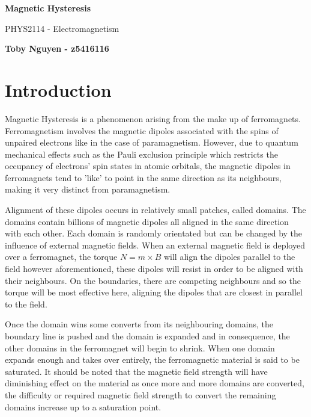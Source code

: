 \documentclass{article}
\begin{document}
\begin{titlepage}
    \begin{center}
        \vspace*{7cm}

        \Huge
        \textbf{Magnetic Hysteresis}

        \vspace{0.5cm}
        \LARGE
        PHYS2114 - Electromagnetism

        \vspace{1.5cm}

        \textbf{Toby Nguyen - z5416116}
    \end{center}
\end{titlepage}

\tableofcontents

\newpage

\section{Introduction}
Magnetic Hysteresis is a phenomenon arising from the make up of ferromagnets. 
Ferromagnetism involves the magnetic dipoles associated with the spins of 
unpaired electrons like in the case of paramagnetism. However, due to quantum
mechanical effects such as the Pauli exclusion principle which restricts the
occupancy of electrons' spin states in atomic orbitals, the magnetic dipoles 
in ferromagnets tend to 'like' to point in the same direction as its neighbours,
making it very distinct from paramagnetism.

Alignment of these dipoles occurs in relatively small patches, called domains.
The domains contain billions of magnetic dipoles all aligned in the same direction
with each other. Each domain is randomly orientated but can be changed by the 
influence of external magnetic fields. When an external magnetic field is deployed
over a ferromagnet, the torque $N = m \times B$ will align the dipoles parallel to
the field however aforementioned, these dipoles will resist in order to be aligned
with their neighbours. On the boundaries, there are competing neighbours and so the
torque will be most effective here, aligning the dipoles that are closest in parallel
to the field.

Once the domain wins some converts from its neighbouring domains, the boundary line 
is pushed and the domain is expanded and in consequence, the other domains in the 
ferromagnet will begin to shrink. When one domain expands enough and takes over 
entirely, the ferromagnetic material is said to be saturated. It should be noted that
the magnetic field strength will have diminishing effect on the material as once more
and more domains are converted, the difficulty or required magnetic field strength to
convert the remaining domains increase up to a saturation point.
\end{document}
